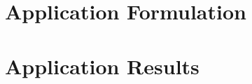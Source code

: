 \doublespace
{}

		\section{Application Formulation} \label{sec:app_form}
		
		\section{Application Results} \label{sec:app_res}